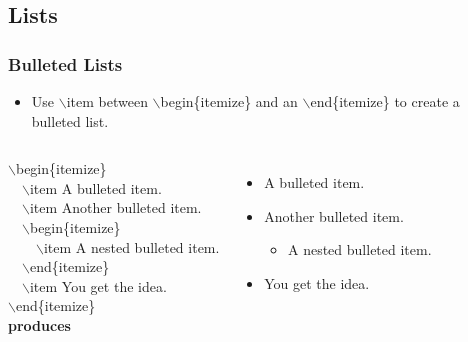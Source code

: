 \documentclass [9pt] {beamer}
\begin{document}
\subsection{Lists}\label{Bulleted Lists}
\begin{frame}\frametitle{Bulleted Lists}
\rm
\fontsize{9pt}{11pt}\selectfont
\begin{itemize}
\item Use \textcolor[rgb]{0.98,0.00,0.00}{$\backslash$item} between \textcolor[rgb]{0.98,0.00,0.00}{$\backslash$begin\{itemize\}} and an \textcolor[rgb]{0.98,0.00,0.00}{$\backslash$end\{itemize\}} to create a bulleted list.\\[.20cm]
\end{itemize}
\begin{columns}[t]
\textcolor[rgb]{0.98,0.00,0.00}{$\backslash$begin\{itemize\}\\
\ \ $\backslash$item A bulleted item.\\
\ \ $\backslash$item Another bulleted item.\\
\ \ $\backslash$begin\{itemize\}\\
\ \ \ \ $\backslash$item A nested bulleted item.\\
\ \ $\backslash$end\{itemize\}\\
\ \ $\backslash$item You get the idea.\\
$\backslash$end\{itemize\}}\\[.20cm]
\textbf{produces}\\[.20cm]
%
\begin{itemize}
\item A bulleted item.
\item Another bulleted item.
\begin{itemize}
\item A nested bulleted item.
\end{itemize}
\item You get the idea.
\end{itemize}
\end{columns}
\end{frame}
\end{document}
